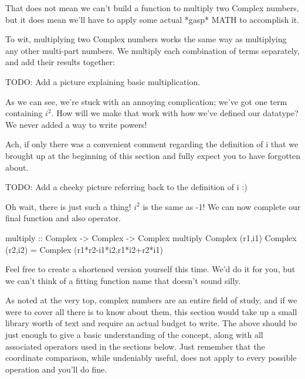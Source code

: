 That does not mean we can't build a function to multiply two Complex numbers, but it does mean we'll have to apply some actual *gasp* MATH to accomplish it.

To wit, multiplying two Complex numbers works the same way as multiplying any other multi-part numbers. We multiply each combination of terms separately, and add their results together:

TODO: Add a picture explaining basic multiplication.

As we can see, we're stuck with an annoying complication; we've got one term containing $i^2$. How will we make that work with how we've defined our datatype? We never added a way to write powers! %

Ach, if only there was a convenient comment regarding the definition of i that we brought up at the beginning of this section and fully expect you to have forgotten about.

TODO: Add a cheeky picture referring back to the definition of i :)

Oh wait, there is just such a thing! $i^2$ is the same as -1! We can now complete our final function and also operator.

\begin{code}
multiply :: Complex -> Complex -> Complex
multiply Complex (r1,i1) Complex (r2,i2)
  = Complex (r1*r2-i1*i2,r1*i2+r2*i1)
\end{code}
Feel free to create a shortened version yourself this time. We'd do it for you, but we can't think of a fitting function name that doesn't sound silly.


As noted at the very top, complex numbers are an entire field of study, and if we were to cover all there is to know about them, this section would take up a small library worth of text and require an actual budget to write. The above should be just enough to give a basic understanding of the concept, along with all associated operators used in the sections below. Just remember that the coordinate comparison, while undeniably useful, does not apply to every possible operation and you'll do fine.


